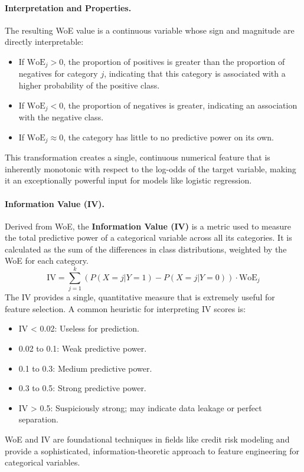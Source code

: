 \begin{itemize}
\paragraph{Interpretation and Properties.}
The resulting WoE value is a continuous variable whose sign and magnitude are directly interpretable:
\begin{itemize}
    \item If $\text{WoE}_j > 0$, the proportion of positives is greater than the proportion of negatives for category $j$, indicating that this category is associated with a higher probability of the positive class.
    \item If $\text{WoE}_j < 0$, the proportion of negatives is greater, indicating an association with the negative class.
    \item If $\text{WoE}_j \approx 0$, the category has little to no predictive power on its own.
\end{itemize}
This transformation creates a single, continuous numerical feature that is inherently monotonic with respect to the log-odds of the target variable, making it an exceptionally powerful input for models like logistic regression.

\paragraph{Information Value (IV).}
Derived from WoE, the \textbf{Information Value (IV)} is a metric used to measure the total predictive power of a categorical variable across all its categories. It is calculated as the sum of the differences in class distributions, weighted by the WoE for each category.
$$ \text{IV} = \sum_{j=1}^{k} \left(P(X=j | Y=1) - P(X=j | Y=0)\right) \cdot \text{WoE}_j $$
The IV provides a single, quantitative measure that is extremely useful for feature selection. A common heuristic for interpreting IV scores is:
\begin{itemize}
    \item IV < 0.02: Useless for prediction.
    \item 0.02 to 0.1: Weak predictive power.
    \item 0.1 to 0.3: Medium predictive power.
    \item 0.3 to 0.5: Strong predictive power.
    \item IV > 0.5: Suspiciously strong; may indicate data leakage or perfect separation.
\end{itemize}
WoE and IV are foundational techniques in fields like credit risk modeling and provide a sophisticated, information-theoretic approach to feature engineering for categorical variables.


\end{itemize}
